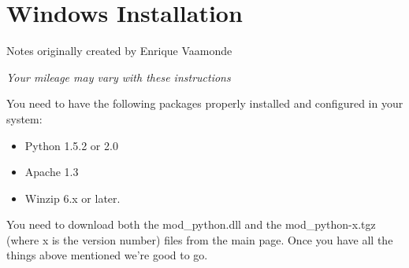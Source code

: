 \chapter{Windows Installation\label{app-wininst}}

Notes originally created by Enrique Vaamonde  

\emph{Your mileage may vary with these instructions}

You need to have the following packages properly installed and
configured in your system:

\begin{itemize}

\item
Python 1.5.2 or 2.0
\item
Apache 1.3
\item
Winzip 6.x or later. 

\end{itemize}


You need to download both the mod_python.dll and the mod_python-x.tgz
(where x is the version number) files from the main page.  Once you
have all the things above mentioned we're good to go.

